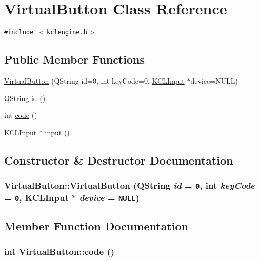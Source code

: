 \hypertarget{class_virtual_button}{
\section{VirtualButton Class Reference}
\label{class_virtual_button}
}
{\tt \#include $<$kclengine.h$>$}

\subsection*{Public Member Functions}
\begin{CompactItemize}
\item 
\hyperlink{class_virtual_button_1e8b82d8e0791b78de6455b51f79c224}{VirtualButton} (QString id=0, int keyCode=0, \hyperlink{class_k_c_l_input}{KCLInput} $\ast$device=NULL)
\item 
QString \hyperlink{class_virtual_button_7ac53085bb39fa49b8f9f32ca882e4db}{id} ()
\item 
int \hyperlink{class_virtual_button_807d21790a5cfa564b1e20d28f900051}{code} ()
\item 
\hyperlink{class_k_c_l_input}{KCLInput} $\ast$ \hyperlink{class_virtual_button_1c67f8dec41ff21d0aa5c07225771e07}{input} ()
\end{CompactItemize}


\subsection{Constructor \& Destructor Documentation}
\hypertarget{class_virtual_button_1e8b82d8e0791b78de6455b51f79c224}{
\subsubsection[{VirtualButton}]{\setlength{\rightskip}{0pt plus 5cm}VirtualButton::VirtualButton (QString {\em id} = {\tt 0}, \/  int {\em keyCode} = {\tt 0}, \/  {\bf KCLInput} $\ast$ {\em device} = {\tt NULL})}}
\label{class_virtual_button_1e8b82d8e0791b78de6455b51f79c224}




\subsection{Member Function Documentation}
\hypertarget{class_virtual_button_807d21790a5cfa564b1e20d28f900051}{
\subsubsection[{code}]{\setlength{\rightskip}{0pt plus 5cm}int VirtualButton::code ()}}
\label{class_virtual_button_807d21790a5cfa564b1e20d28f900051}



